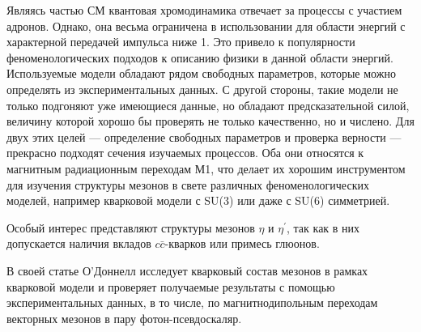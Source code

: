 Являясь частью СМ квантовая хромодинамика отвечает за процессы с участием адронов. Однако, она весьма ограничена в использовании для области энергий с характерной передачей импульса ниже \SI{1}{\GeVr}.
Это привело к популярности феноменологических подходов к описанию физики в данной области энергий.
Используемые модели обладают рядом свободных параметров,
которые можно определять из экспериментальных данных. С другой стороны,
такие модели не только подгоняют уже имеющиеся данные, но обладают
предсказательной силой, величину которой хорошо бы проверять не только качественно, но и числено. Для двух
этих целей --- определение свободных параметров и проверка верности ---
прекрасно подходят сечения изучаемых процессов.
Оба они относятся к магнитным радиационным переходам М1,
что делает их хорошим инструментом для изучения структуры мезонов в
свете различных феноменологических моделей, например кварковой модели с
SU(3) или даже с SU(6) симметрией.


Особый интерес представляют структуры мезонов $\eta$ и $\eta^\prime$, так как в них допускается наличия вкладов $c\bar{c}$-кварков или примесь глюонов. 

В своей статье О'Доннелл \cite{ODonnell:1981sj} исследует кварковый состав мезонов в
рамках кварковой модели и проверяет получаемые результаты с помощью
экспериментальных данных, в то числе, по магнитнодипольным переходам
векторных мезонов в пару фотон-псевдоскаляр.

